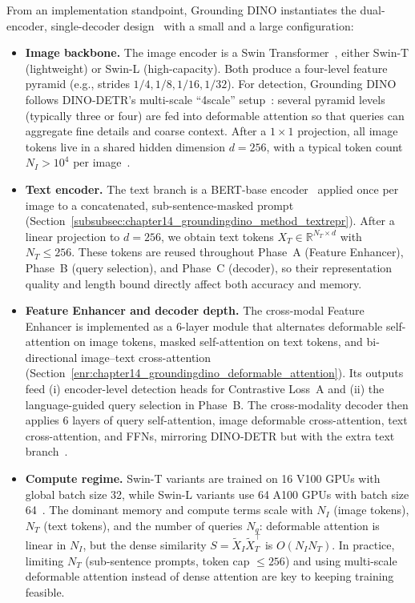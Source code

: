 \begin{enrichment}
\begin{enrichment}
		From an implementation standpoint, Grounding DINO instantiates the dual-encoder, single-decoder design~\cite{liu2023_groundingdino} with a small and a large configuration:
		\begin{itemize}
			\item \textbf{Image backbone.}  
			The image encoder is a Swin Transformer~\cite{liu2021_swin}, either Swin-T (lightweight) or Swin-L (high-capacity). Both produce a four-level feature pyramid (e.g., strides \(1/4, 1/8, 1/16, 1/32\)). For detection, Grounding DINO follows DINO-DETR’s multi-scale ``4scale'' setup~\cite{zhang2022_dino}: several pyramid levels (typically three or four) are fed into deformable attention so that queries can aggregate fine details and coarse context. After a \(1\times 1\) projection, all image tokens live in a shared hidden dimension \(d=256\), with a typical token count \(N_I > 10^4\) per image~\cite{liu2023_groundingdino}.
			
			\item \textbf{Text encoder.}  
			The text branch is a BERT-base encoder~\cite{devlin2019_bert} applied once per image to a concatenated, sub-sentence-masked prompt (Section~\ref{subsubsec:chapter14_groundingdino_method_textrepr}). After a linear projection to \(d=256\), we obtain text tokens \(X_T \in \mathbb{R}^{N_T \times d}\) with \(N_T \leq 256\). These tokens are reused throughout Phase~A (Feature Enhancer), Phase~B (query selection), and Phase~C (decoder), so their representation quality and length bound directly affect both accuracy and memory.
			
			\item \textbf{Feature Enhancer and decoder depth.}  
			The cross-modal Feature Enhancer is implemented as a 6-layer module that alternates deformable self-attention on image tokens, masked self-attention on text tokens, and bi-directional image–text cross-attention (Section~\ref{enr:chapter14_groundingdino_deformable_attention}). Its outputs feed (i) encoder-level detection heads for Contrastive Loss~A and (ii) the language-guided query selection in Phase~B. The cross-modality decoder then applies 6 layers of query self-attention, image deformable cross-attention, text cross-attention, and FFNs, mirroring DINO-DETR but with the extra text branch~\cite{zhang2022_dino,liu2023_groundingdino}.
			
			\item \textbf{Compute regime.}  
			Swin-T variants are trained on 16 V100 GPUs with global batch size 32, while Swin-L variants use 64 A100 GPUs with batch size 64~\cite{liu2023_groundingdino}. The dominant memory and compute terms scale with \(N_I\) (image tokens), \(N_T\) (text tokens), and the number of queries \(N_q\): deformable attention is linear in \(N_I\), but the dense similarity \(S = \tilde{X}_I \tilde{X}_T^\top\) is \(O(N_I N_T)\). In practice, limiting \(N_T\) (sub-sentence prompts, token cap \(\leq 256\)) and using multi-scale deformable attention instead of dense attention are key to keeping training feasible.
		\end{itemize}
		

\end{enrichment}
\end{enrichment}
